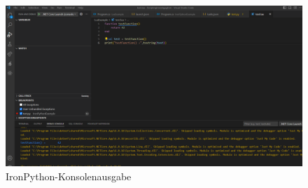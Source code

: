 \begin{itemize}
    \begin{figure}[H]
        \centering
        \includegraphics[scale=0.5]{pics/IronPythonKonsolenausgabe.png}
        \caption{IronPython-Konsolenausgabe}
        \label{fig:impl:IronPythonKonsolenausgabe}
    \end{figure}
\end{itemize}